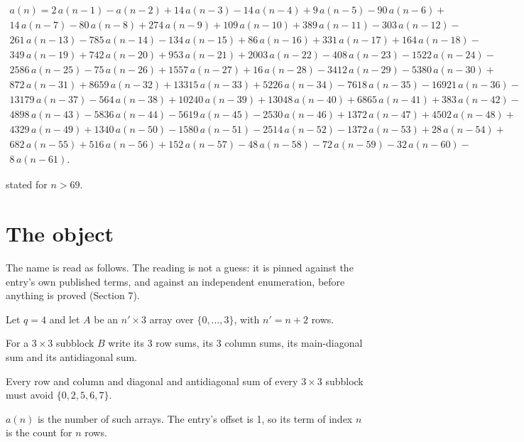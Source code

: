 \documentclass[11pt]{article}
\theoremstyle{definition}
\begin{document}
\begin{multline*} a(n) = 2\,a(n-1) - a(n-2) + 14\,a(n-3) - 14\,a(n-4) + 9\,a(n-5) - 90\,a(n-6) + \\ 14\,a(n-7) - 80\,a(n-8) + 274\,a(n-9) + 109\,a(n-10) + 389\,a(n-11) - 303\,a(n-12) - \\ 261\,a(n-13) - 785\,a(n-14) - 134\,a(n-15) + 86\,a(n-16) + 331\,a(n-17) + 164\,a(n-18) - \\ 349\,a(n-19) + 742\,a(n-20) + 953\,a(n-21) + 2003\,a(n-22) - 408\,a(n-23) - 1522\,a(n-24) - \\ 2586\,a(n-25) - 75\,a(n-26) + 1557\,a(n-27) + 16\,a(n-28) - 3412\,a(n-29) - 5380\,a(n-30) + \\ 872\,a(n-31) + 8659\,a(n-32) + 13315\,a(n-33) + 5226\,a(n-34) - 7618\,a(n-35) - 16921\,a(n-36) - \\ 13179\,a(n-37) - 564\,a(n-38) + 10240\,a(n-39) + 13048\,a(n-40) + 6865\,a(n-41) + 383\,a(n-42) - \\ 4898\,a(n-43) - 5836\,a(n-44) - 5619\,a(n-45) - 2530\,a(n-46) + 1372\,a(n-47) + 4502\,a(n-48) + \\ 4329\,a(n-49) + 1340\,a(n-50) - 1580\,a(n-51) - 2514\,a(n-52) - 1372\,a(n-53) + 28\,a(n-54) + \\ 682\,a(n-55) + 516\,a(n-56) + 152\,a(n-57) - 48\,a(n-58) - 72\,a(n-59) - 32\,a(n-60) - \\ 8\,a(n-61). \end{multline*}

stated for $n > 69$.

\section{The object}

The name is read as follows. The reading is not a guess: it is pinned against the entry's own published terms, and against an independent enumeration, before anything is proved (Section 7).

Let $q = 4$ and let $A$ be an $n' \times 3$ array over $\{0,\dots,3\}$, with $n' = n + 2$ rows.

For a $3\times3$ subblock $B$ write its 3 row sums, its 3 column sums, its main-diagonal sum and its antidiagonal sum.

Every row and column and diagonal and antidiagonal sum of every $3\times3$ subblock must avoid $\{0, 2, 5, 6, 7\}$.

$a(n)$ is the number of such arrays. The entry's offset is 1, so its term of index $n$ is the count for $n$ rows.
\end{document}
